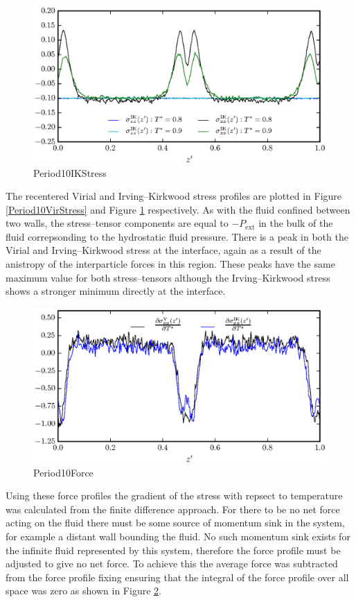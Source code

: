 \begin{figure}[h]
\includegraphics[scale=0.8]{Period10IKStress}
\caption{Period10IKStress}
\label{Period10IKStress}
\end{figure}
The recentered Virial and Irving--Kirkwood stress profiles are plotted in Figure \ref{Period10VirStress} and Figure \ref{Period10IKStress} respectively.
As with the fluid confined between two walls, the stress--tensor components are equal to $-P_{\mathrm{ext}}$ in the bulk of the fluid correpsonding to the hydrostatic fluid pressure.
There is a peak in both the Virial and Irving--Kirkwood stress at the interface, again as a result of the anistropy of the interparticle forces in this region.
These peaks have the same maximum value for both stress--tensors although the Irving--Kirkwood stress shows a stronger minimum directly at the interface.
\FloatBarrier

\begin{figure}[h]
\includegraphics[scale=0.8]{Period10Force}
\caption{Period10Force}
\label{Period10Force}
\end{figure}
Using these force profiles the gradient of the stress with repsect to temperature was calculated from the finite difference approach.
For there to be no net force acting on the fluid there must be some source of momentum sink in the system, for example a distant wall bounding the fluid.
No such momentum sink exists for the infinite fluid represented by this system, therefore the force profile must be adjusted to give no net force.
To achieve this the average force was subtracted from the force profile fixing ensuring that the integral of the force profile over all space was zero as shown in Figure \ref{Period10Force}.

